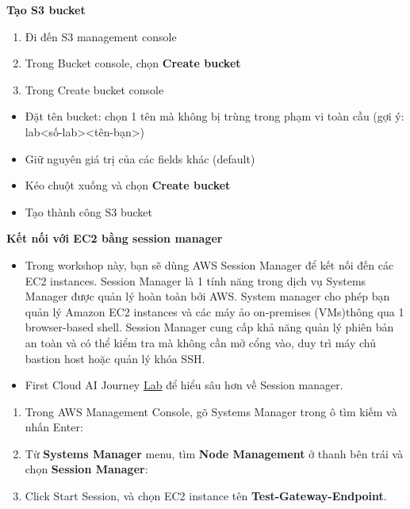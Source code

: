 \vspace{0.5em}\noindent\textbf{Tạo S3 bucket}\par

\begin{enumerate}
\def\labelenumi{\arabic{enumi}.}
\item
  Đi đến S3 management console
\item
  Trong Bucket console, chọn \textbf{Create bucket}
\item
  Trong Create bucket console
\end{enumerate}

\begin{itemize}
\item
  Đặt tên bucket: chọn 1 tên mà không bị trùng trong phạm vi toàn cầu
  (gợi ý: lab\textless số-lab\textgreater\textless tên-bạn\textgreater)
\item
  Giữ nguyên giá trị của các fields khác (default)
\item
  Kéo chuột xuống và chọn \textbf{Create bucket}
\item
  Tạo thành công S3 bucket
\end{itemize}

\vspace{0.5em}\noindent\textbf{Kết nối với EC2 bằng session
manager}\par

\begin{itemize}
\item
  Trong workshop này, bạn sẽ dùng AWS Session Manager để kết nối đến các
  EC2 instances. Session Manager là 1 tính năng trong dịch vụ Systems
  Manager được quản lý hoàn toàn bởi AWS. System manager cho phép bạn
  quản lý Amazon EC2 instances và các máy ảo on-premises (VMs)thông qua
  1 browser-based shell. Session Manager cung cấp khả năng quản lý phiên
  bản an toàn và có thể kiểm tra mà không cần mở cổng vào, duy trì máy
  chủ bastion host hoặc quản lý khóa SSH.
\item
  First Cloud AI Journey
  \href{https://000058.awsstudygroup.com/1-introduce/}{Lab} để hiểu sâu
  hơn về Session manager.
\end{itemize}

\begin{enumerate}
\def\labelenumi{\arabic{enumi}.}
\item
  Trong AWS Management Console, gõ Systems Manager trong ô tìm kiếm và
  nhấn Enter:
\item
  Từ \textbf{Systems Manager} menu, tìm \textbf{Node Management} ở thanh
  bên trái và chọn \textbf{Session Manager}:
\item
  Click Start Session, và chọn EC2 instance tên
  \textbf{Test-Gateway-Endpoint}.
\end{enumerate}

